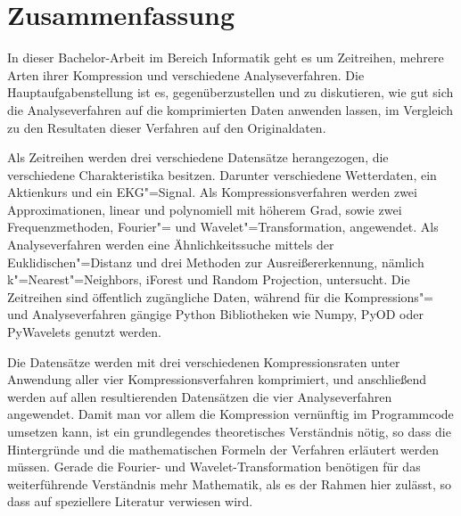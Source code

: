 \chapter*{Zusammenfassung}
In dieser Bachelor-Arbeit im Bereich Informatik geht es um Zeitreihen, mehrere Arten ihrer Kompression und verschiedene Analyseverfahren. Die Hauptaufgabenstellung ist es,
gegenüberzustellen und zu diskutieren, wie gut sich die Analyseverfahren auf die komprimierten Daten anwenden lassen, im Vergleich zu den Resultaten dieser Verfahren auf den
Originaldaten.

Als Zeitreihen werden drei verschiedene Datensätze herangezogen, die verschiedene Charakteristika besitzen. Darunter verschiedene Wetterdaten, ein Aktienkurs und ein EKG"=Signal. Als Kompressionsverfahren werden zwei Approximationen, linear und polynomiell mit höherem Grad, sowie zwei Frequenzmethoden, Fourier"= und Wavelet"=Transformation, angewendet. Als Analyseverfahren werden eine Ähnlichkeitssuche mittels der Euklidischen"=Distanz und drei Methoden zur Ausreißererkennung, nämlich k"=Nearest"=Neighbors, iForest und Random Projection, untersucht. Die Zeitreihen sind öffentlich zugängliche Daten, während für die Kompressions"= und Analyseverfahren gängige Python Bibliotheken wie Numpy, PyOD oder PyWavelets genutzt werden.

Die Datensätze werden mit drei verschiedenen Kompressionsraten unter Anwendung aller vier Kompressionsverfahren komprimiert, und anschließend werden auf allen resultierenden Datensätzen die vier Analyseverfahren angewendet. Damit man vor allem die Kompression vernünftig im Programmcode umsetzen kann, ist ein grundlegendes theoretisches Verständnis nötig, so dass die Hintergründe und die mathematischen Formeln der Verfahren erläutert werden müssen. Gerade die Fourier- und Wavelet-Transformation benötigen für das weiterführende Verständnis mehr Mathematik, als es der Rahmen hier zulässt, so dass auf speziellere Literatur verwiesen wird.
